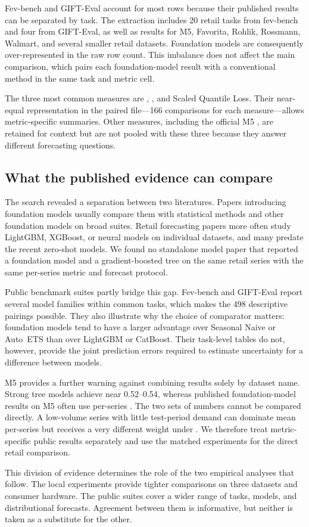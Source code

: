 Fev-bench and GIFT-Eval account for most rows because their published results
can be separated by task. The extraction includes 20 retail tasks from
fev-bench and four from GIFT-Eval, as well as results for M5, Favorita,
Rohlik, Rossmann, Walmart, and several smaller retail datasets. Foundation
models are consequently over-represented in the raw row count. This imbalance
does not affect the main comparison, which pairs each foundation-model result
with a conventional method in the same task and metric cell.

The three most common measures are \WAPE{}, \MASE{}, and Scaled Quantile Loss.
Their near-equal representation in the paired file---166 comparisons for each
measure---allows metric-specific summaries. Other measures, including the
official M5 \WRMSSE{}, are retained for context but are not pooled with these
three because they answer different forecasting questions.
\label{subsec:descriptive}

\subsection{What the published evidence can compare}
\label{subsec:narrative}

The search revealed a separation between two literatures. Papers introducing
foundation models usually compare them with statistical methods and other
foundation models on broad suites. Retail forecasting papers more often study
LightGBM, XGBoost, or neural models on individual datasets, and many predate
the recent zero-shot models. We found no standalone model paper that reported
a foundation model and a gradient-boosted tree on the same retail series with
the same per-series metric and forecast protocol.

Public benchmark suites partly bridge this gap. Fev-bench and GIFT-Eval report
several model families within common tasks, which makes the 498 descriptive
pairings possible. They also illustrate why the choice of comparator matters:
foundation models tend to have a larger advantage over Seasonal Naive or
Auto~ETS than over LightGBM or CatBoost. Their task-level tables do not,
however, provide the joint prediction errors required to estimate uncertainty
for a difference between models.

M5 provides a further warning against combining results solely by dataset
name. Strong tree models achieve \WRMSSE{} near 0.52--0.54, whereas
published foundation-model results on M5 often use per-series \WAPE{}. The two
sets of numbers cannot be compared directly. A low-volume series with little
test-period demand can dominate mean per-series \WAPE{} but receives a very
different weight under \WRMSSE{}. We therefore treat metric-specific public
results separately and use the matched experiments for the direct retail
comparison.

This division of evidence determines the role of the two empirical analyses
that follow. The local experiments provide tighter comparisons on three
datasets and consumer hardware. The public suites cover a wider range of
tasks, models, and distributional forecasts. Agreement between them is
informative, but neither is taken as a substitute for the other.
\label{subsec:structural-finding}
